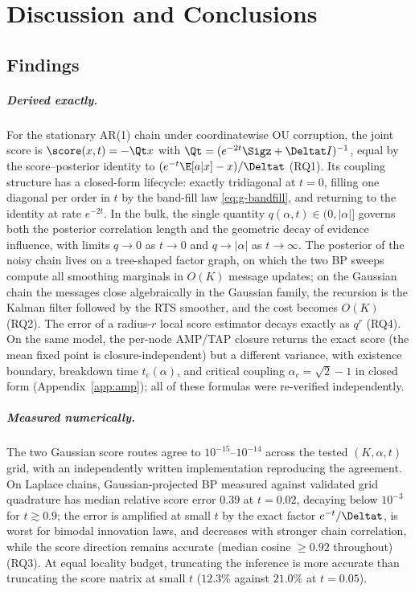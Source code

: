 \chapter{Discussion and Conclusions}\label{ch:conclusions}

\section{Findings}\label{sec:conclusions-findings}\label{sec:conclusions-amp}

\paragraph{Derived exactly.} For the stationary AR(1) chain under
coordinatewise OU corruption, the joint score is $\score(x,t) = -\Qt x$
with $\Qt = (e^{-2t}\Sigz + \Deltat I)^{-1}$, equal by the
score--posterior identity to $(e^{-t}\E[a|x] - x)/\Deltat$ (RQ1). Its
coupling structure has a closed-form lifecycle: exactly tridiagonal at
$t = 0$, filling one diagonal per order in $t$ by the band-fill law
\eqref{eq:g-bandfill}, and returning to the identity at rate $e^{-2t}$.
In the bulk, the single quantity $q(\alpha, t) \in (0, |\alpha|]$ governs
both the posterior correlation length and the geometric decay of evidence
influence, with limits $q \to 0$ as $t \to 0$ and $q \to |\alpha|$ as
$t \to \infty$. The posterior of the noisy chain lives on a tree-shaped
factor graph, on which the two BP sweeps compute all smoothing marginals
in $O(K)$ message updates; on the Gaussian chain the messages close
algebraically in the Gaussian family, the recursion is the Kalman filter
followed by the RTS smoother, and the cost becomes $O(K)$ (RQ2). The
error of a radius-$r$ local score estimator decays exactly as $q^r$
(RQ4). On the same model, the per-node AMP/TAP closure returns the exact
score (the mean fixed point is closure-independent) but a different
variance, with existence boundary, breakdown time $t_c(\alpha)$, and
critical coupling $\alpha_c = \sqrt{2} - 1$ in closed form
(Appendix~\ref{app:amp}); all of these formulas were re-verified
independently.

\paragraph{Measured numerically.} The two Gaussian score routes agree to
$10^{-15}$--$10^{-14}$ across the tested $(K, \alpha, t)$ grid, with an
independently written implementation reproducing the agreement. On
Laplace chains, Gaussian-projected BP measured against validated grid
quadrature has median relative score error $0.39$ at $t = 0.02$,
decaying below $10^{-3}$ for $t \gtrsim 0.9$; the error is amplified at
small $t$ by the exact factor $e^{-t}/\Deltat$, is worst for bimodal
innovation laws, and decreases with stronger chain correlation, while
the score direction remains accurate (median cosine $\geq 0.92$
throughout) (RQ3). At equal locality budget, truncating the inference is
more accurate than truncating the score matrix at small $t$ ($12.3\%$
against $21.0\%$ at $t = 0.05$).

